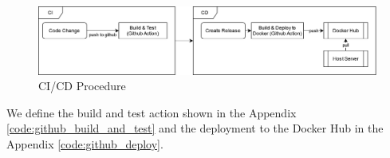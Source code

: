 \begin{figure}[h!]
\centering
\includegraphics[width=\textwidth]{images/CICD_flow.drawio.png}
\caption{\label{fig:cicd}CI/CD Procedure}
\end{figure}


We define the build and test action shown in the Appendix \ref{code:github_build_and_test} and the deployment to the Docker Hub in the Appendix \ref{code:github_deploy}.
